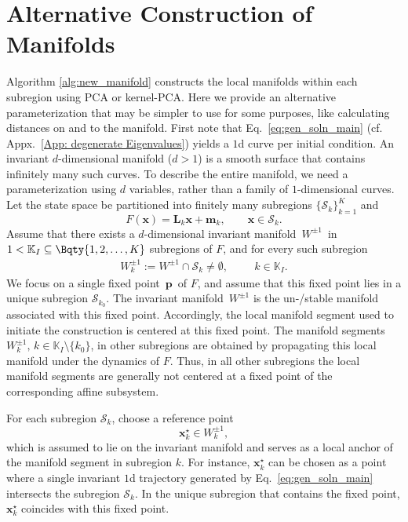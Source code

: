 \documentclass{article}
\theoremstyle{example}
\theoremstyle{plain}
\theoremstyle{definition}
\theoremstyle{remark}
\def\eqref#1{equation~\ref{#1}}
\def\vm{{\bm{m}}}
\def\vp{{\bm{p}}}
\def\vx{{\bm{x}}}
\def\mL{{\bm{L}}}
\renewcommand{\eqref}[1]{Eq.~\ref{#1}}
\begin{document}
\section{Alternative Construction of Manifolds}
\label{app:param}
Algorithm \ref{alg:new_manifold} constructs the local manifolds within each subregion using PCA or kernel-PCA. Here we provide an alternative parameterization that may be simpler to use for some purposes, like calculating distances on and to the manifold. %
First note that \eqref{eq:gen_soln_main} (cf. Appx.~\ref{App: degenerate Eigenvalues}) yields a $1$d curve per initial condition. An invariant $d$-dimensional manifold ($d>1$) is a smooth surface that contains infinitely many such curves. 
To describe the entire manifold, we need a parameterization using $d$ variables, rather than a family of $1$-dimensional curves. 
Let the state space be partitioned into finitely many subregions
$\{\mathcal S_k\}_{k=1}^K$ and 
\begin{equation}
F(\vx)=\mL_k \vx + \vm_k , \qquad \vx\in\mathcal S_k .
\end{equation}
Assume that there exists a $d$-dimensional invariant manifold
$\,  W^{\pm1} \,$ in $1< \mathbb{K}_I  \subseteq \Bqty{1, 2, \hdots, K}$ subregions of $F$, and for every such subregion
\begin{align}
W^{\pm1}_k :=  W^{\pm1}\cap \mathcal S_k \neq \emptyset, \hspace{1cm} k \in \mathbb{K}_I.
\end{align}
We focus on a single fixed point $\, \vp \,$ of $F$, and assume that this fixed point lies in a unique subregion $ \mathcal{S}_{k_0}$. The invariant manifold $\, W^{\pm1} $ is the un-/stable manifold associated with this fixed point. Accordingly, the local manifold segment used to initiate the construction is centered at this fixed point. The manifold segments $ W^{\pm1}_k, \, k \in \mathbb{K}_I\setminus\{ k_0\}$, in other subregions are obtained by propagating this local manifold under the dynamics of $F$.
Thus, in all other subregions the local manifold segments are generally not centered at a fixed point of the corresponding affine subsystem.

For each subregion $\mathcal S_k$, choose a reference point
\begin{equation}
\vx_k^\star \in W^{\pm1}_k,
\end{equation}
which is assumed to lie on the invariant manifold and serves as a local anchor of the manifold segment in subregion $k$. For instance, $\vx_k^\star$ can be chosen as a point where a single invariant
$1$d trajectory generated by \eqref{eq:gen_soln_main} intersects the subregion $\mathcal S_k$. In the unique subregion that contains the fixed point, $\vx_k^\star$ coincides with this fixed point.
\end{document}
